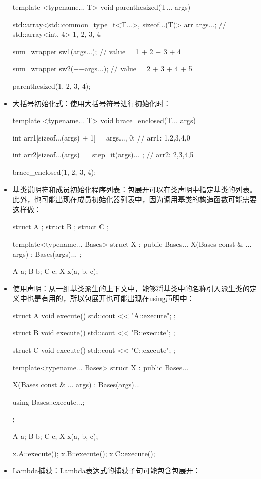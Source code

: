 \begin{itemize}
\begin{cpp}
template <typename... T>
void parenthesized(T... args)
{
	std::array<std::common_type_t<T...>,
	           sizeof...(T)> arr {args...};
	// std::array<int, 4> {1, 2, 3, 4}
	
	sum_wrapper sw1(args...);
	// value = 1 + 2 + 3 + 4
	
	sum_wrapper sw2(++args...);
	// value = 2 + 3 + 4 + 5
}
parenthesized(1, 2, 3, 4);
\end{cpp}
  \item 大括号初始化式：使用大括号符号进行初始化时：

\begin{cpp}
template <typename... T>
void brace_enclosed(T... args)
{
	int arr1[sizeof...(args) + 1] = {args..., 0};
	// arr1: {1,2,3,4,0}
	
	int arr2[sizeof...(args)] = { step_it(args)... };
	// arr2: {2,3,4,5}
}

brace_enclosed(1, 2, 3, 4);
\end{cpp}
  \item 基类说明符和成员初始化程序列表：包展开可以在类声明中指定基类的列表。此外，也可能出现在成员初始化器列表中，因为调用基类的构造函数可能需要这样做：

\begin{cpp}
struct A {};
struct B {};
struct C {};

template<typename... Bases>
struct X : public Bases...
{
	X(Bases const & ... args) : Bases(args)...
	{ }
};

A a;
B b;
C c;
X x(a, b, c);
\end{cpp}
  \item 使用声明：从一组基类派生的上下文中，能够将基类中的名称引入派生类的定义中也是有用的，所以包展开也可能出现在using声明中：

\begin{cpp}
struct A
{
	void execute() { std::cout << "A::execute\n"; }
};

struct B
{
	void execute() { std::cout << "B::execute\n"; }
};

struct C
{
	void execute() { std::cout << "C::execute\n"; }
};

template<typename... Bases>
struct X : public Bases...
{
	X(Bases const & ... args) : Bases(args)...
	{}
	
	using Bases::execute...;
};

A a;
B b;
C c;
X x(a, b, c);

x.A::execute();
x.B::execute();
x.C::execute();
\end{cpp}
  \item Lambda捕获：Lambda表达式的捕获子句可能包含包展开：


\end{itemize}
